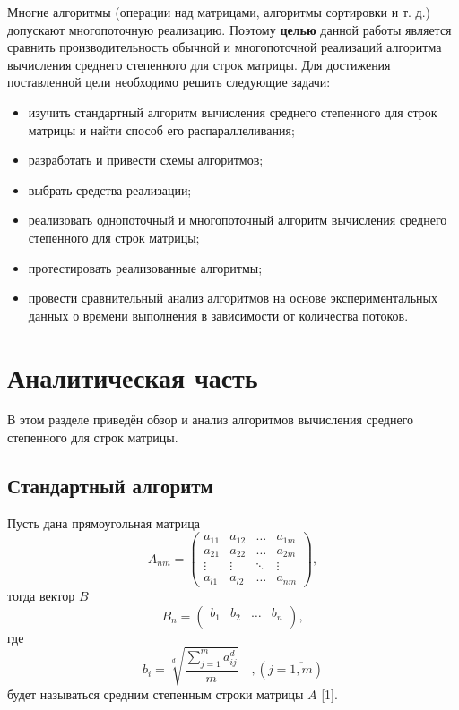 \documentclass[12pt]{report}
\begin{document}
Многие алгоритмы (операции над матрицами, алгоритмы сортировки и т. д.) допускают многопоточную реализацию. Поэтому \textbf{целью} данной работы является сравнить производительность обычной и многопоточной реализаций алгоритма вычисления среднего степенного для строк матрицы.
Для достижения поставленной цели необходимо решить следующие задачи:
\begin{itemize}
	\item изучить стандартный алгоритм вычисления среднего степенного для строк матрицы и найти способ его распараллеливания;
	\item разработать и привести схемы алгоритмов;
	\item выбрать средства реализации;
	\item реализовать однопоточный и многопоточный алгоритм вычисления среднего степенного для строк матрицы;
	\item протестировать реализованные алгоритмы;
	\item провести сравнительный анализ алгоритмов на основе экспериментальных данных о времени выполнения в зависимости от количества потоков.
\end{itemize}


\chapter{Аналитическая часть}

В этом разделе приведён обзор и анализ алгоритмов вычисления среднего степенного для строк матрицы.

\section{Стандартный алгоритм}

Пусть дана прямоугольная матрица
\begin{equation}
	A_{nm} = \begin{pmatrix}
		a_{11} & a_{12} & \ldots & a_{1m}\\
		a_{21} & a_{22} & \ldots & a_{2m}\\
		\vdots & \vdots & \ddots & \vdots\\
		a_{l1} & a_{l2} & \ldots & a_{nm}
	\end{pmatrix},
\end{equation}
тогда вектор $B$
\begin{equation}
	B_{n} = \begin{pmatrix}
		b_{1} & b_{2} & \ldots & b_{n}\\
	\end{pmatrix},
\end{equation}
где
\begin{equation}
	\label{eq:M}
	b_{i} = \sqrt[d]{\frac{\sum_{j=1}^{m} a_{ij} ^ d}{m}} \quad, (j=\overline{1,m})
\end{equation}
будет называться средним степенным строки матрицы $A$ [1].
\end{document}
